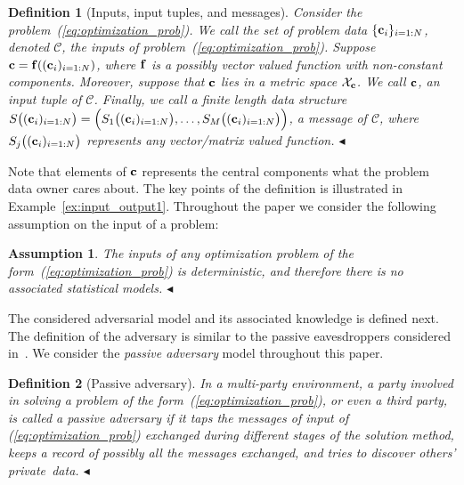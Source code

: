 \documentclass[12pt,draftcls,onecolumn]{IEEEtran}
\newtheorem{defin}{Definition}\newtheorem{assump}{Assumption}
\renewcommand{\vec}[1]{\bf{#1}}     \newcommand{\vecsc}[1]{\mbox {\boldmath \scriptsize $#1$}}     \newcommand{\itvec}[1]{\mbox {\boldmath $#1$}}
\newcommand{\add}[1]{{{\color{blue!0!black}#1}}}
\newcommand{\addnew}[1]{{{\color{blue!0!black}#1}}}
\begin{document}
\addnew{
\begin{defin}[Inputs, input tuples, and messages]\label{def:input}
Consider the problem~(\ref{eq:optimization_prob}). We call the \emph{set of problem data} $\{{\vec c}_i\}_{i=1:N}$, denoted $\mathcal{C}$, the \emph{inputs} of problem~(\ref{eq:optimization_prob}). Suppose ${\vec c} = {\vec f}(({\vec c}_i)_{i=1:N})$, where ${\vec f}$ is a possibly vector valued function with non-constant components. Moreover, suppose that ${\vec c}$ lies in a metric space $\mathcal{X}_{\vec c}$. We call ${\vec c}$, an \emph{input tuple} of $\mathcal{C}$. Finally, we call a finite length data structure ${S}\big(({\vec c}_i)_{i=1:N}\big)=\Big(S_1\big(({\vec c}_i)_{i=1:N}\big),\ldots,S_M\big(({\vec c}_i)_{i=1:N}\big)\Big)$, a \emph{message} of $\mathcal{C}$, where $S_j\big(({\vec c}_i)_{i=1:N}\big)$ represents any vector/matrix valued function. \hfill $\blacktriangleleft$
\end{defin}
}
\addnew{Note that elements of ${\vec c}$ represents the central components what the problem data owner cares about. The key points of the definition is illustrated in Example~\ref{ex:input_output1}. Throughout the paper we consider the following assumption on the input of a problem:}
\addnew{
\begin{assump}\label{assump:input}
The inputs of any optimization problem of the form~(\ref{eq:optimization_prob}) is deterministic, and therefore there is no associated statistical models. \hfill $\blacktriangleleft$
\end{assump}
}
The considered adversarial model and its associated knowledge is defined next. The definition of the adversary is similar to the passive eavesdroppers considered in~\cite[\S~5.1-5.3]{Goldreich-book-2004}. We consider the \emph{passive adversary} model throughout this paper.





\begin{defin}[\add{Passive adversary}]\label{def:adversary}
\add{In a multi-party environment, a party involved in solving a problem of the form~(\ref{eq:optimization_prob}), or even a third party, is called a passive adversary if it taps the messages of input of (\ref{eq:optimization_prob}) exchanged during different stages of the solution method, keeps a record of possibly all the messages exchanged, and tries to discover others' private~data.}  \hfill $\blacktriangleleft$
\end{defin}
\end{document}

